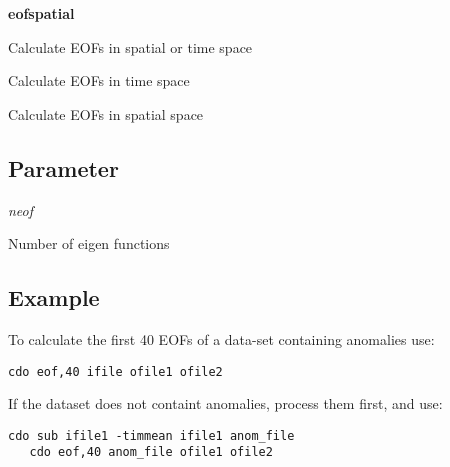 \setlength{\miniwidth}{\textwidth}
\addtolength{\miniwidth}{-8mm}
\hspace*{8mm}\begin{minipage}{\miniwidth}
\begin{defalist}{\bf eofspatial \ }
\item[{\bf eof}\ \ \hfill]
Calculate EOFs in spatial or time space \\
\item[{\bf eoftime}\ \ \hfill]
Calculate EOFs in time space \\
\item[{\bf eofspatial}\ \ \hfill]
Calculate EOFs in spatial space \\
\end{defalist}
\end{minipage}
\addtolength{\miniwidth}{8mm}

\subsection*{Parameter}

\setlength{\miniwidth}{\textwidth}
\addtolength{\miniwidth}{-8mm}
\hspace*{8mm}\begin{minipage}{\miniwidth}
\begin{defalist}{\sl neof \ }
\item[{\sl neof}\ \ \hfill]
  Number of eigen functions
\end{defalist}
\end{minipage}
\addtolength{\miniwidth}{8mm}

\subsection*{Example}

\setlength{\miniwidth}{\textwidth}
\addtolength{\miniwidth}{-8mm}
\hspace*{8mm}\begin{minipage}{\miniwidth}
To calculate the first 40 EOFs of a data-set containing anomalies use:
\begin{lstlisting}[backgroundcolor=\color{zebg}, basicstyle=\small]
   cdo eof,40 ifile ofile1 ofile2
\end{lstlisting}

If the dataset does not containt anomalies, process them first,
and use:
\begin{lstlisting}[backgroundcolor=\color{zebg}, basicstyle=\small]
   cdo sub ifile1 -timmean ifile1 anom_file	
   cdo eof,40 anom_file ofile1 ofile2	
\end{lstlisting}
\end{minipage}
\addtolength{\miniwidth}{8mm}


